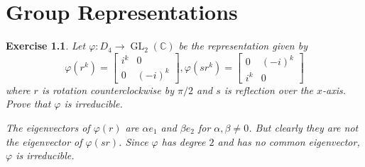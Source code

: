 \documentclass[11pt]{report}
\theoremstyle{mythm}
\let\oldendproof\endproof
\renewenvironment{proof}[1][\proofname]{%
  \oldproof[\normalfont \bfseries #1]%
}{\oldendproof}
\newtheorem{exercise}{Exercise}[chapter]
\renewcommand*{\proofname}{Proof}
\theoremstyle{myans}
\newcommand{\bbC}{\mathbb C}
\DeclareMathOperator{\GL}{GL}
\begin{document}
\setcounter{chapter}{2}
\chapter{Group Representations}

\begin{exercise}
  Let $\varphi\colon D_4 \to \GL_2(\bbC)$ be the representation given by
  \[ \varphi(r^k) = \begin{bmatrix}
    i^k & 0 \\ 0 & (-i)^k
  \end{bmatrix}, \varphi(sr^k) = \begin{bmatrix}
    0 & (-i)^k \\ i^k & 0
  \end{bmatrix} \]
  where $r$ is rotation counterclockwise by $\pi/2$ and $s$ is reflection over the $x$-axis.
  Prove that $\varphi$ is irreducible.
  \begin{proof}
    The eigenvectors of $\varphi(r)$ are $\alpha e_1$ and $\beta e_2$ for $\alpha, \beta\neq 0$.
    But clearly they are not the eigenvector of $\varphi(sr)$. Since $\varphi$ has degree $2$
    and has no common eigenvector, $\varphi$ is irreducible.
  \end{proof}
\end{exercise}
\end{document}
